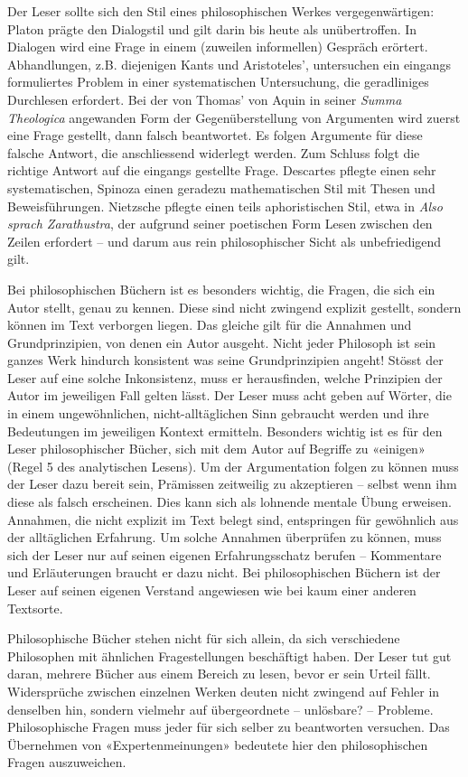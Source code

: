 \documentclass[a4paper,11pt]{scrartcl}
\begin{document}
Der Leser sollte sich den Stil eines philosophischen Werkes vergegenwärtigen: Platon prägte den Dialogstil und gilt darin bis heute als unübertroffen. In Dialogen wird eine Frage in einem (zuweilen informellen) Gespräch erörtert. Abhandlungen, z.B. diejenigen Kants und Aristoteles', untersuchen ein eingangs formuliertes Problem in einer systematischen Untersuchung, die geradliniges Durchlesen erfordert. Bei der von Thomas' von Aquin in seiner \textit{Summa Theologica} angewanden Form der Gegenüberstellung von Argumenten wird zuerst eine Frage gestellt, dann falsch beantwortet. Es folgen Argumente für diese falsche Antwort, die anschliessend widerlegt werden. Zum Schluss folgt die richtige Antwort auf die eingangs gestellte Frage. Descartes pflegte einen sehr systematischen, Spinoza einen geradezu mathematischen Stil mit Thesen und Beweisführungen. Nietzsche pflegte einen teils aphoristischen Stil, etwa in \textit{Also sprach Zarathustra}, der aufgrund seiner poetischen Form Lesen zwischen den Zeilen erfordert – und darum aus rein philosophischer Sicht als unbefriedigend gilt.

Bei philosophischen Büchern ist es besonders wichtig, die Fragen, die sich ein Autor stellt, genau zu kennen. Diese sind nicht zwingend explizit gestellt, sondern können im Text verborgen liegen. Das gleiche gilt für die Annahmen und Grundprinzipien, von denen ein Autor ausgeht. Nicht jeder Philosoph ist sein ganzes Werk hindurch konsistent was seine Grundprinzipien angeht! Stösst der Leser auf eine solche Inkonsistenz, muss er herausfinden, welche Prinzipien der Autor im jeweiligen Fall gelten lässt. Der Leser muss acht geben auf Wörter, die in einem ungewöhnlichen, nicht-alltäglichen Sinn gebraucht werden und ihre Bedeutungen im jeweiligen Kontext ermitteln. Besonders wichtig ist es für den Leser philosophischer Bücher, sich mit dem Autor auf Begriffe zu «einigen» (Regel 5 des analytischen Lesens). Um der Argumentation folgen zu können muss der Leser dazu bereit sein, Prämissen zeitweilig zu akzeptieren – selbst wenn ihm diese als falsch erscheinen. Dies kann sich als lohnende mentale Übung erweisen. Annahmen, die nicht explizit im Text belegt sind, entspringen für gewöhnlich aus der alltäglichen Erfahrung. Um solche Annahmen überprüfen zu können, muss sich der Leser nur auf seinen eigenen Erfahrungsschatz berufen – Kommentare und Erläuterungen braucht er dazu nicht. Bei philosophischen Büchern ist der Leser auf seinen eigenen Verstand angewiesen wie bei kaum einer anderen Textsorte.

Philosophische Bücher stehen nicht für sich allein, da sich verschiedene Philosophen mit ähnlichen Fragestellungen beschäftigt haben. Der Leser tut gut daran, mehrere Bücher aus einem Bereich zu lesen, bevor er sein Urteil fällt. Widersprüche zwischen einzelnen Werken deuten nicht zwingend auf Fehler in denselben hin, sondern vielmehr auf übergeordnete – unlösbare? – Probleme. Philosophische Fragen muss jeder für sich selber zu beantworten versuchen. Das Übernehmen von «Expertenmeinungen» bedeutete hier den philosophischen Fragen auszuweichen.
\end{document}
